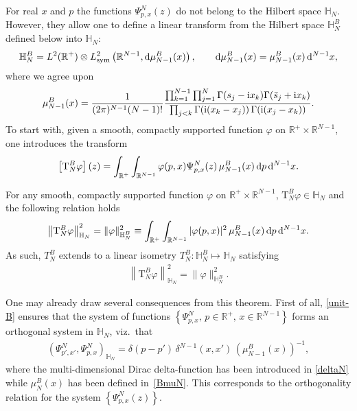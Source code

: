 For real $x$ and $p$ the functions $\Psi^N_{p, x}({z})$ do not belong to the Hilbert space $\mathbb H_N$. However, they allow one to
define a linear transform from the Hilbert space $\mathbb H_N^B$ defined below into $\mathbb H_N$:
\begin{gather*}
\mathbb H_N^B =L^2(\mathbb R^+)\otimes L^2_{\rm sym}\left(\mathbb R^{N-1},{\rm d}\mu^B_{N-1}(x)\right), \qquad
{\rm d}\mu^B_{N-1}(x)=\mu^B_{N-1}(x)\, {\rm d}^{N-1}x,
\end{gather*}
where we agree upon
\begin{gather}\label{BmuN}
\mu_{N-1}^{B}(x)=\frac1{(2\pi)^{N-1} (N-1)!}
\frac{\prod_{k=1}^{N-1}\prod_{j=1}^N\Gamma(s_j-{\rm i}x_k)\Gamma(\bar s_j+{\rm i}x_k)}
{\prod_{j< k}\Gamma({\rm i}(x_k-x_j))\,\Gamma({\rm i}(x_j-x_k))}.
\end{gather}
To start with, given a smooth, compactly supported function $\varphi$ on $\mathbb{R}^+\times\mathbb{R}^{N-1}$, one introduces the transform
\begin{gather}\label{Bclosed-map}
\left[ \mathrm T_{N}^{B}\varphi\right]( z)
=\int_{\mathbb R^+} \int_{\mathbb R^{N-1}} \varphi(p, x)
 \Psi^N_{p,{x}}({z})\, \mu_{N-1}^{B}( x)\, {\rm d}p\, {\rm d}^{N-1} x.
\end{gather}


\begin{Theorem}
For any smooth, compactly supported function $\varphi$ on $\mathbb{R}^+\times\mathbb{R}^{N-1}$,
 $ \mathrm T_{N}^{B}\varphi \in \mathbb{H}_N$ and the following relation holds
\begin{gather}\label{unit-B}
\left\|\mathrm T_{N}^{B}\varphi\right\|_{\mathbb H_N}^2=\|{\varphi}\|_{\mathbb H_N^{B}}^2
\equiv \int_{\mathbb R^+} \int_{\mathbb R^{N-1}} |\varphi(p, x)|^2\,
 \mu_{N-1}^{B}( x) \,{\rm d}p\, {\rm d}^{N-1} x.
\end{gather}
As such, $T_{N}^{B}$ extends to a linear isometry $T_{N}^{B}\colon \mathbb H_N^B \mapsto \mathbb H_N$ satisfying
\begin{gather*}
\left\|\mathrm T_{N}^{B}\varphi\right\|_{\mathbb H_N}^2=\|{\varphi}\|_{\mathbb H_N^{B}}^2 .
\end{gather*}
\end{Theorem}

One may already draw several consequences from this theorem. First of all, \eqref{unit-B} ensures that the system of functions
$\left\{\Psi^{N}_{p,{x}},\, p\in \mathbb R^+, \,x \in \mathbb R^{N-1}\right\}$ forms an orthogonal system in $\mathbb H_N$, viz.~that
\begin{gather*}%
\left(\Psi^N_{p', x'}, \Psi^N_{p,{x}}\right)_{\mathbb{H}_N}= \delta(p-p')\,
\delta^{N-1}( x , x') \, \left(\mu_{N-1}^{B}( x)\right)^{-1}\!,
\end{gather*}
where the multi-dimensional Dirac delta-function has been introduced in \eqref{deltaN} while $\mu_N^{B}( x)$ has been defined in~\eqref{BmuN}. This corresponds to the orthogonality relation for the system $\left\{\Psi^N_{p,{x}}(z)\right\}$.


